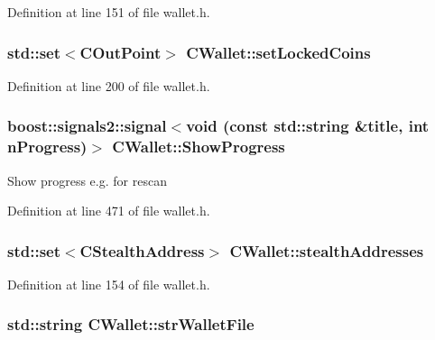 Definition at line 151 of file wallet.\+h.

\hypertarget{class_c_wallet_a658aebcd4c617f5a29f5df3d8878c450}{}
\subsubsection[{set\+Locked\+Coins}]{\setlength{\rightskip}{0pt plus 5cm}std\+::set$<${\bf C\+Out\+Point}$>$ C\+Wallet\+::set\+Locked\+Coins}\label{class_c_wallet_a658aebcd4c617f5a29f5df3d8878c450}


Definition at line 200 of file wallet.\+h.

\hypertarget{class_c_wallet_a845a2f2911b9b022f0e58ab577e795ea}{}
\subsubsection[{Show\+Progress}]{\setlength{\rightskip}{0pt plus 5cm}boost\+::signals2\+::signal$<$void (const std\+::string \&title, int n\+Progress)$>$ C\+Wallet\+::\+Show\+Progress}\label{class_c_wallet_a845a2f2911b9b022f0e58ab577e795ea}
Show progress e.\+g. for rescan 

Definition at line 471 of file wallet.\+h.

\hypertarget{class_c_wallet_a148a31a8069304a6593b3c5266417b10}{}
\subsubsection[{stealth\+Addresses}]{\setlength{\rightskip}{0pt plus 5cm}std\+::set$<${\bf C\+Stealth\+Address}$>$ C\+Wallet\+::stealth\+Addresses}\label{class_c_wallet_a148a31a8069304a6593b3c5266417b10}


Definition at line 154 of file wallet.\+h.

\hypertarget{class_c_wallet_a3e886f3a3b20228770e082b3fc014fc7}{}
\subsubsection[{str\+Wallet\+File}]{\setlength{\rightskip}{0pt plus 5cm}std\+::string C\+Wallet\+::str\+Wallet\+File}\label{class_c_wallet_a3e886f3a3b20228770e082b3fc014fc7}


